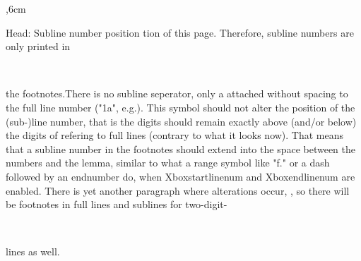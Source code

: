 \documentclass[BCOR10mm,headinclude,fontsize=12,headsepline,numbers=endperiod]{scrbook}
\begin{document}
\setlength{\parindent}{0pt}

\beginnumbering

,6cm
\rightskip=1cm

\pstart Head: Subline number position\pend\vspace{0.75em}
\pstart\leftskip=0cmtion of this page. Therefore, subline numbers are only printed in\linebreak\parbox{2,6cm}{{\ }}the footnotes.\pend \vspace{0.4em}\pstart There is no subline seperator, only a  attached without spacing to the full line number ("1a", e.g.). This symbol should not alter the position of the (sub-)line number, that is the digits should remain exactly above (and/or below) the digits of  refering to full lines (contrary to what it looks now). That means that a subline number in the footnotes should extend into the space between the numbers and the lemma, similar to what a range symbol like "f." or a dash followed by an endnumber do, when Xboxstartlinenum and Xboxendlinenum are enabled. \pend\vspace{0.4em}\pstart\rightskip=0cm There is yet another paragraph where alterations occur, , so \linebreak there will be footnotes in full lines and sublines for two-digit-\parbox{1cm}{{\ }}\linebreak lines as well.
\pend

\endnumbering
\end{document}
